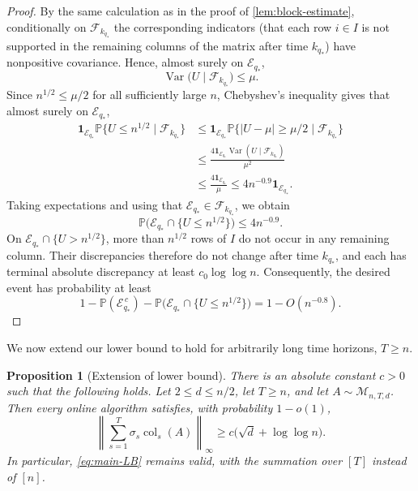 \documentclass[reqno,english]{amsart}
\newcommand*{\PP}{\mathbb P}
\newcommand*{\calF}{\mathcal F}
\newcommand*{\calM}{\mathcal M}
\newcommand*{\ind}{\mathbf 1}
\newcommand*{\col}{\operatorname{col}}
\newcommand*{\Var}{\operatorname{Var}}
\newtheorem{proposition}[proposition]{Proposition}
\theoremstyle{definition}
\begin{document}
\begin{proof}
By the same calculation as in the proof of
\cref{lem:block-estimate}, conditionally on $\calF_{k_{q_*}}$ the
corresponding indicators (that each row $i\in I$ is not supported in the remaining columns of the matrix after time $k_{q_*}$) have nonpositive covariance. Hence, almost surely
on $\mathcal E_{q_*}$,
\[
    \Var\big(U\mid\calF_{k_{q_*}}\big)\le\mu.
\]
Since $n^{1/2}\le\mu/2$ for all sufficiently large $n$, Chebyshev's
inequality gives that almost surely on $\mathcal E_{q_*}$,
\[
\begin{aligned}
    \ind_{\mathcal E_{q_*}}
    \PP\big\{U\le n^{1/2}\mid\mathcal F_{k_{q_*}}\big\}
    &\le
    \ind_{\mathcal E_{q_*}}
    \PP\big\{|U-\mu|\ge\mu/2\mid\mathcal F_{k_{q_*}}\big\} \\
    &\le
    \frac{4\ind_{\mathcal E_{q_*}}
    \Var(U\mid\mathcal F_{k_{q_*}})}{\mu^2} \\
    &\le \frac{4\ind_{\mathcal E_{q_*}}}{\mu}
    \le 4n^{-0.9}\ind_{\mathcal E_{q_*}}.
\end{aligned}
\]
Taking expectations and using that
$\mathcal E_{q_*}\in\mathcal F_{k_{q_*}}$, we obtain
\[
    \PP\big(\mathcal E_{q_*}\cap\{U\le n^{1/2}\}\big)
    \le 4n^{-0.9}.
\]
On $\mathcal E_{q_*}\cap\{U>n^{1/2}\}$, more than $n^{1/2}$ rows of $I$
do not occur in any remaining column.  Their discrepancies therefore do not
change after time $k_{q_*}$, and each has terminal absolute discrepancy at
least $c_0\log\log n$.  Consequently, the desired event has probability at
least
\[
    1-\PP(\mathcal E_{q_*}^{\,c})
      -\PP\big(\mathcal E_{q_*}\cap\{U\le n^{1/2}\}\big)
    =1-O(n^{-0.8}).
\]


\end{proof}

We now extend our lower bound to hold for arbitrarily long time horizons, $T \ge n$. 
\begin{proposition}[Extension of lower bound]
\label{prop:lower-horizons}
There is an absolute constant $c>0$ such that the following holds.  Let
$2\le d\le n/2$, let $T\ge n$, and let $A\sim\calM_{n,T,d}$.  Then every
online algorithm satisfies, with probability $1-o(1)$,
\[
    \left\|\sum_{s=1}^T\sigma_s\col_s(A)\right\|_\infty
    \ge c\big(\sqrt d+\log\log n\big).
\]
In particular, \eqref{eq:main-LB} remains valid, with the summation over $[T]$ instead of $[n]$.
\end{proposition}
\end{document}
